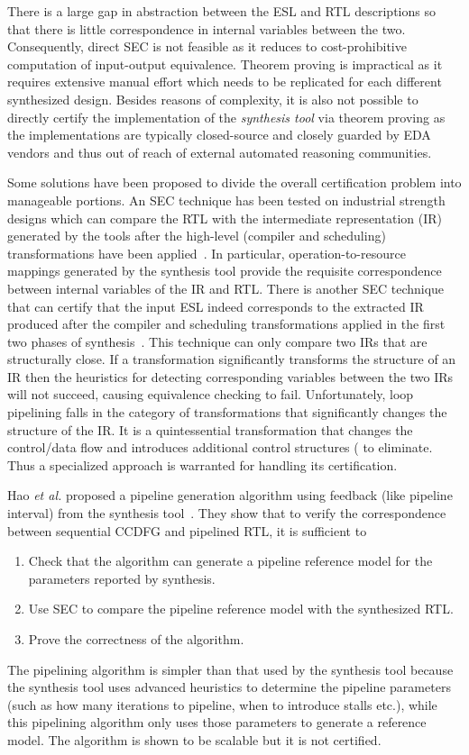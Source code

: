 There is a large gap in abstraction
between the ESL and RTL descriptions so that there is little
correspondence in internal variables between the two.  Consequently,
direct SEC is not feasible as it reduces to cost-prohibitive computation of
input-output equivalence. Theorem proving is impractical as it requires extensive manual effort 
which needs to be replicated for each different synthesized
design. Besides reasons of complexity, it is also not possible to
directly certify the implementation of the {\em synthesis tool} via
theorem proving as the implementations are typically closed-source and
closely guarded by EDA vendors and thus out of reach of external
automated reasoning communities.

Some solutions have been proposed to divide the overall certification problem into manageable portions.
An SEC technique has been tested on industrial strength designs which can compare the RTL 
with the intermediate representation (IR) generated by the tools after the high-level (compiler and scheduling)
transformations have been applied~\cite{rhcxy:atva-09,hxry:date-10}.  In particular,
operation-to-resource mappings generated by the synthesis
tool provide the requisite correspondence between internal
variables of the IR and RTL. There is another SEC technique that 
can certify that the input ESL indeed corresponds to the extracted 
IR produced after the compiler and scheduling transformations applied in the
first two phases of synthesis~\cite{zhenkun:iccd-13}. This technique
can only compare two IRs that are structurally close.  If a
transformation significantly transforms the structure of an IR then
the heuristics for detecting corresponding variables between the two
IRs will not succeed, causing equivalence checking to fail.
Unfortunately, loop pipelining falls in the category of
transformations that significantly changes the structure of the IR.
It is a quintessential transformation that changes the control/data
flow and introduces additional control structures (%
to eliminate. Thus a specialized approach is warranted for
handling its certification.

Hao {\em et al.} proposed a pipeline generation algorithm using feedback (like pipeline interval) from the synthesis tool~\cite{hrx:dac-12}. 
They show that to verify the correspondence between sequential CCDFG and pipelined RTL, it is sufficient to
\begin{enumerate} 
\item Check that the algorithm can generate a pipeline reference model for the parameters reported by synthesis.
\item Use SEC to compare the pipeline reference model with the synthesized RTL.
\item Prove the correctness of the algorithm. 
\end{enumerate}
The pipelining algorithm is simpler than that used by the synthesis tool because the synthesis tool uses advanced heuristics to determine the pipeline parameters (such as how many iterations to pipeline, when to introduce stalls etc.), while this pipelining algorithm only uses those parameters to generate a reference model. The algorithm is shown to be scalable but it is not certified. 

